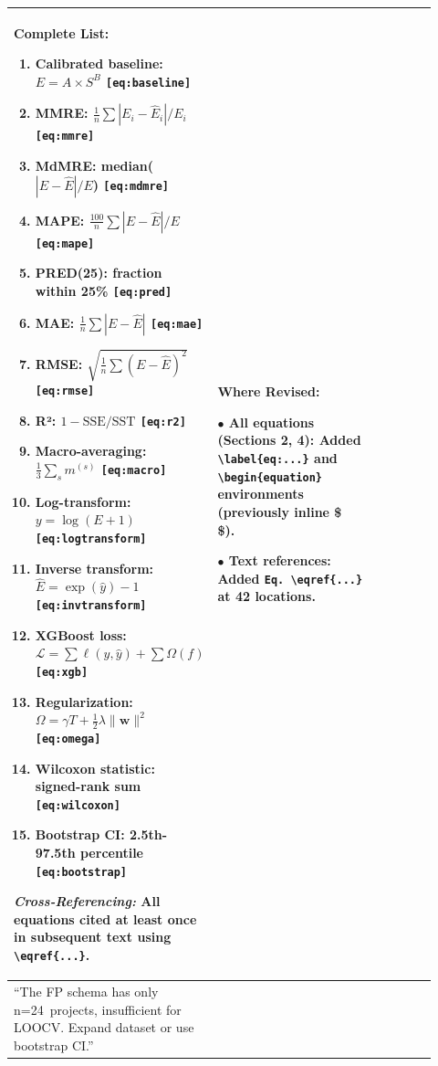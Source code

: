 \documentclass[11pt,a4paper]{article}
\begin{document}
\begin{longtable}{>{\raggedright\arraybackslash}p{0.26\linewidth}|>{\raggedright\arraybackslash}p{0.44\linewidth}|>{\raggedright\arraybackslash}p{0.22\linewidth}}
\textbf{Complete List:}
\begin{enumerate}
    \item Calibrated baseline: $E = A \times S^B$ \texttt{[eq:baseline]}
    \item MMRE: $\frac{1}{n}\sum |E_i - \hat{E}_i|/E_i$ \texttt{[eq:mmre]}
    \item MdMRE: median($|E - \hat{E}|/E$) \texttt{[eq:mdmre]}
    \item MAPE: $\frac{100}{n}\sum |E - \hat{E}|/E$ \texttt{[eq:mape]}
    \item PRED(25): fraction within 25\% \texttt{[eq:pred]}
    \item MAE: $\frac{1}{n}\sum |E - \hat{E}|$ \texttt{[eq:mae]}
    \item RMSE: $\sqrt{\frac{1}{n}\sum (E - \hat{E})^2}$ \texttt{[eq:rmse]}
    \item R²: $1 - \text{SSE}/\text{SST}$ \texttt{[eq:r2]}
    \item Macro-averaging: $\frac{1}{3}\sum_s m^{(s)}$ \texttt{[eq:macro]}
    \item Log-transform: $y = \log(E+1)$ \texttt{[eq:logtransform]}
    \item Inverse transform: $\hat{E} = \exp(\hat{y}) - 1$ \texttt{[eq:invtransform]}
    \item XGBoost loss: $\mathcal{L} = \sum \ell(y, \hat{y}) + \sum \Omega(f)$ \texttt{[eq:xgb]}
    \item Regularization: $\Omega = \gamma T + \frac{1}{2}\lambda \|\mathbf{w}\|^2$ \texttt{[eq:omega]}
    \item Wilcoxon statistic: signed-rank sum \texttt{[eq:wilcoxon]}
    \item Bootstrap CI: 2.5th-97.5th percentile \texttt{[eq:bootstrap]}
\end{enumerate}

\textit{Cross-Referencing:} All equations cited at least once in subsequent text using \texttt{\textbackslash eqref\{...\}}. &

\textbf{Where Revised:}

$\bullet$ \textbf{All equations} (Sections 2, 4): Added \texttt{\textbackslash label\{eq:...\}} and \texttt{\textbackslash begin\{equation\}} environments (previously inline \$ \$).

$\bullet$ \textbf{Text references}: Added \texttt{Eq.~\textbackslash eqref\{...\}} at 42 locations. \\

\midrule

``The FP schema has only n=24~projects, insufficient for LOOCV. Expand dataset or use bootstrap CI.'' &


\end{longtable}
\end{document}
